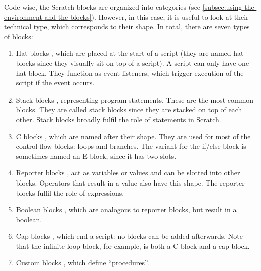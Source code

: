 \documentclass[../main]{subfiles}
\begin{document}
Code-wise, the Scratch blocks are organized into categories (see \cref{subsec:using-the-environment-and-the-blocks}).
However, in this case, it is useful to look at their technical type, which corresponds to their shape.
In total, there are seven types of blocks:

\begin{enumerate}[noitemsep]
    \item Hat blocks \scratchinline{\blockinit{\hspace{1em}\dots\hspace*{1em}}}, which are placed at the start of a script (they are named hat blocks since they visually sit on top of a script).
        A script can only have one hat block.
        They function as event listeners, which trigger execution of the script if the event occurs.
    \item Stack blocks \scratchinline{\blockmove{\hspace{1em}\dots\hspace*{0.5cm}}}, representing program statements.
        These are the most common blocks.
        They are called stack blocks since they are stacked on top of each other.
        Stack blocks broadly fulfil the role of statements in Scratch.
    \item C blocks \scratchinline{\blockif{\hspace{1em}\dots\hspace*{1em}}{\blockspace[0.2]}}, which are named after their shape.
        They are used for most of the control flow blocks: loops and branches.
        The variant for the if/else block is sometimes named an E block, since it has two slots.
    \item Reporter blocks \ovalmove{\hspace{1em}\dots\hspace*{1em}}, act as variables or values and can be slotted into other blocks.
        Operators that result in a value also have this shape.
        The reporter blocks fulfil the role of expressions.
    \item Boolean blocks \boolsensing{\hspace{1em}\dots\hspace*{1em}}, which are analogous to reporter blocks, but result in a boolean.
    \item Cap blocks \scratchinline{\blockstop{\hspace{1em}\dots\hspace*{1em}}}, which end a script: no blocks can be added afterwards.
        Note that the infinite loop block, for example, is both a C block and a cap block.
    \item Custom blocks , which define ``procedures''.
\end{enumerate}
\end{document}
